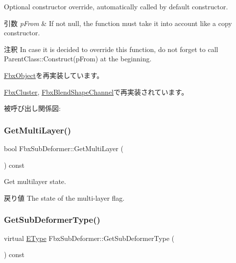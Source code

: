 Optional constructor override, automatically called by default constructor. 
\begin{DoxyParams}{引数}
{\em p\+From} & If not null, the function must take it into account like a copy constructor. \\
\hline
\end{DoxyParams}
\begin{DoxyRemark}{注釈}
In case it is decided to override this function, do not forget to call Parent\+Class\+::\+Construct(p\+From) at the beginning. 
\end{DoxyRemark}


\hyperlink{class_fbx_object_a313503bc645af3fdceb4a99ef5cea7eb}{Fbx\+Object}を再実装しています。



\hyperlink{class_fbx_cluster_a80619129929789d80930b2bbb524593c}{Fbx\+Cluster}, \hyperlink{class_fbx_blend_shape_channel_ad16237e4706289af6a9235b8425415cb}{Fbx\+Blend\+Shape\+Channel}で再実装されています。

被呼び出し関係図\+:
\mbox{\label{class_fbx_sub_deformer_a9a430ccafe4f08c976b9963627b5de05}} 
\subsubsection{\texorpdfstring{Get\+Multi\+Layer()}{GetMultiLayer()}}
{\footnotesize\ttfamily bool Fbx\+Sub\+Deformer\+::\+Get\+Multi\+Layer (\begin{DoxyParamCaption}{ }\end{DoxyParamCaption}) const}

Get multilayer state. \begin{DoxyReturn}{戻り値}
The state of the multi-\/layer flag. 
\end{DoxyReturn}
\mbox{\label{class_fbx_sub_deformer_a1a1998b98ca03598bc6bec630e1aaa97}} 
\subsubsection{\texorpdfstring{Get\+Sub\+Deformer\+Type()}{GetSubDeformerType()}}
{\footnotesize\ttfamily virtual \hyperlink{class_fbx_sub_deformer_aed7eba8aabbb8b25a8ddbab127d67319}{E\+Type} Fbx\+Sub\+Deformer\+::\+Get\+Sub\+Deformer\+Type (\begin{DoxyParamCaption}{ }\end{DoxyParamCaption}) const\hspace{0.3cm}{\ttfamily [virtual]}}

